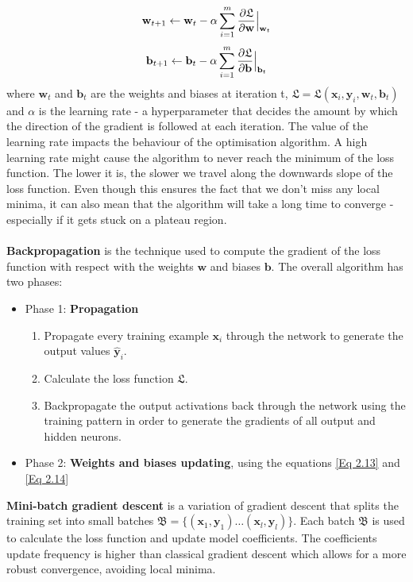 \begin{equation}
\centering
\mathbf{w}_{t+1} \leftarrow \mathbf{w}_t - \alpha \sum_{i=1}^{m}\frac{\partial \mathfrak{L}}{\partial \mathbf{w}}\Bigr|_{\substack{\mathbf{w}_t}}
\label{Eq: gdes/update/weights}
\end{equation}
\begin{equation}
\centering
\mathbf{b}_{t+1} \leftarrow \mathbf{b}_t - \alpha \sum_{i=1}^{m}\frac{\partial \mathfrak{L}}{\partial \mathbf{b}}\Bigr|_{\substack{\mathbf{b}_t}}
\label{Eq: gdes/update/weigts}
\end{equation}
where $\mathbf{w}_t$ and $\mathbf{b}_t$ are the weights and biases at iteration t, $\mathfrak{L} = \mathfrak{L}(\mathbf{x}_i, \mathbf{y}_i, \mathbf{w}_t, \mathbf{b}_t)$ and $\alpha$ is the learning rate - a hyperparameter that decides the amount by which the direction of the gradient is followed at each iteration. The value of the learning rate impacts the behaviour of the optimisation algorithm. A high learning rate might cause the algorithm to never reach the minimum of the loss function. The lower it is, the slower we travel along the downwards slope of the loss function. Even though this ensures the fact that we don't miss any local minima, it can also mean that the algorithm will take a long time to converge - especially if it gets stuck on a plateau region. 
\\ \\
\textbf{Backpropagation} is the technique used to compute the gradient of the loss function with respect with the weights $\mathbf{w}$ and biases $\mathbf{b}$. The overall algorithm has two phases:
\begin{itemize}
	\item Phase 1: \textbf{Propagation}
	\begin{enumerate}
		\item Propagate every training example $\mathbf{x}_i$ through the network to generate the output values $\mathbf{\hat{y}}_i$.
		\item Calculate the loss function $\mathfrak{L}$.
		\item Backpropagate the output activations back through the network using the training pattern in order to generate the gradients of all output and hidden neurons.
	\end{enumerate}
	\item Phase 2: \textbf{Weights and biases updating}, using the equations \ref{Eq 2.13} and \ref{Eq 2.14}
\end{itemize}
\textbf{Mini-batch gradient descent} is a variation of gradient descent that splits the training set into small batches $\mathfrak{B}=\{(\mathbf{x}_1, \mathbf{y}_1)\dots(\mathbf{x}_l, \mathbf{y}_l)\}$. Each batch $\mathfrak{B}$ is used to calculate the loss function and update model coefficients. The coefficients update frequency is higher than classical gradient descent which allows for a more robust convergence, avoiding local minima. 
